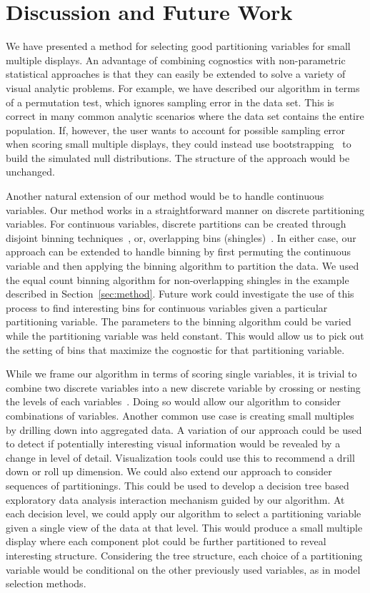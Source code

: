 \section{Discussion and Future Work}
\label{sec:discussion}
We have presented a method for selecting good partitioning variables for small multiple displays.
An advantage of combining cognostics with non-parametric statistical approaches is that they can easily be extended to solve a variety of visual analytic problems. For example, we have described our algorithm in terms of a permutation test, which ignores sampling error in the data set. This is correct in many common analytic scenarios where the data set contains the entire population. If, however, the user wants to account for possible sampling error when scoring small multiple displays, they could instead use bootstrapping~\cite{Efron1994} to build the simulated null distributions. The structure of the approach would be unchanged.

Another natural extension of our method would be to handle continuous variables. Our method works in a straightforward manner on discrete partitioning variables. For continuous variables, discrete partitions can be created through disjoint binning techniques~\cite{Freedman1981,Scott2009}, or, overlapping bins (shingles)~\cite{Becker1996}. In either case, our approach can be extended to handle binning by first permuting the continuous variable and then applying the binning algorithm to partition the data. We used the equal count binning algorithm for non-overlapping shingles in the example described in Section~\ref{sec:method}. Future work could investigate the use of this process to find interesting bins for continuous variables given a particular partitioning variable. The parameters to the binning algorithm could be varied while the partitioning variable was held constant. This would allow us to pick out the setting of bins that maximize the cognostic for that partitioning variable. 

While we frame our algorithm in terms of scoring single variables, it is trivial to combine two discrete variables into a new discrete variable by crossing or nesting the levels of each variables~\cite{Wilkinson2005GG,Stolte2002}. Doing so would allow our algorithm to consider combinations of variables. 
Another common use case is creating small multiples by drilling down into aggregated data. A variation of our approach could be used to detect if potentially interesting visual information would be revealed by a change in level of detail. Visualization tools could use this to recommend a drill down or roll up dimension.
We could also extend our approach to consider sequences of partitionings. This could be used to develop a decision tree based exploratory data analysis interaction mechanism guided by our algorithm. At each decision level, we could apply our algorithm to select a partitioning variable given a single view of the data at that level. This would produce a small multiple display where each component plot could be further partitioned to reveal interesting structure. Considering the tree structure, each choice of a partitioning variable would be conditional on the other previously used variables, as in model selection methods. 

